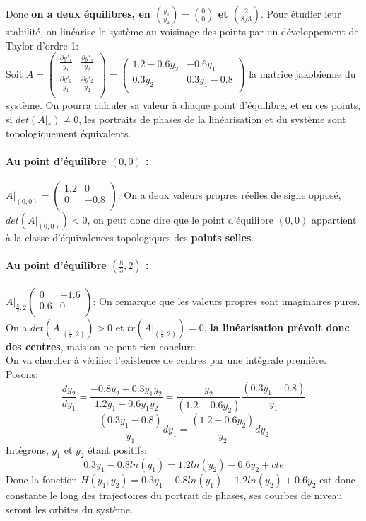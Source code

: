\documentclass[a4paper,12pt,landscape]{article}
\begin{document}
Donc \textbf{on a deux équilibres, en ${y_1 \choose y_2}={0 \choose 0}$ et ${2 \choose  8/3}$}. Pour étudier leur stabilité, on linéarise le système au voisinage des points par un développement de Taylor d'ordre 1:\\
Soit $
A=
\left(
\begin{array}{cc}
\frac{\partial y'_1}{y_1} & \frac{\partial y'_1}{y_2} \\
\frac{\partial y'_2}{y_1} & \frac{\partial y'_2}{y_2} \\
\end{array}
\right)
=
\left(
\begin{array}{cc}
1.2-0.6y_2 & -0.6y_1 \\
0.3y_2 & 0.3y_1-0.8 \\
\end{array}
\right)$ la matrice jakobienne du système. On pourra calculer sa valeur à chaque point d'équilibre, et en ces points, si $det(A|_{*})\neq0$, les portraits de phases de la linéarisation et du système sont topologiquement équivalents.
\paragraph{Au point d'équilibre $(0,0)$ :}
$A|_{(0,0)}=
\left(
\begin{array}{cc}
1.2 & 0 \\
0 & -0.8 \\
\end{array}
\right)$: On a deux valeurs propres réelles de signe opposé, $det(A|_{(0,0)})<0$, on peut donc dire que le point d'équilibre $(0,0)$ appartient à la classe d'équivalences topologiques des \textbf{points selles}.

\paragraph{Au point d'équilibre $(\frac{8}{3},2)$ :}
$A|_{\frac{8}{3},2}
\left(
\begin{array}{cc}
0&-1.6 \\
0.6&0 \\
\end{array}
\right)$: On remarque que les valeurs propres sont imaginaires pures. On a $det(A|_{(\frac{3}{8},2)})>0$ et $tr(A|_{(\frac{3}{8},2)})=0$, \textbf{la linéarisation prévoit donc des centres}, mais on ne peut rien conclure.\\

On va chercher à vérifier l'existence de centres par une intégrale première. Posons:
$$\frac{dy_2}{dy_1}=\frac{-0.8y_2+0.3y_1y_2}{1.2y_1-0.6y_1y_2}=\frac{y_2}{(1.2-0.6y_2)}\frac{(0.3y_1-0.8)}{y_1}$$
$$\frac{(0.3y_1-0.8)}{y_1}dy_1=\frac{(1.2-0.6y_2)}{y_2}dy_2$$
Intégrons, $y_1$ et $y_2$ étant positifs:
$$0.3y_1-0.8ln(y_1)=1.2ln(y_2)-0.6y_2+cte$$
Donc la fonction $H(y_1,y_2)=0.3y_1-0.8ln(y_1)-1.2ln(y_2)+0.6y_2$ est donc constante le long des trajectoires du portrait de phases, ses courbes de niveau seront les orbites du système.\\
\end{document}
